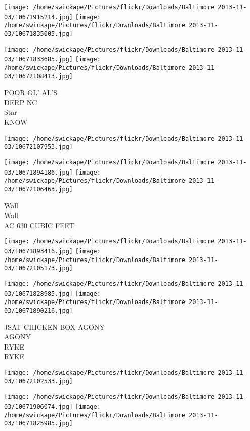 \documentclass[10pt,letterpaper]{article}
\begin{document}
\texttt{[image: /home/swickape/Pictures/flickr/Downloads/Baltimore 2013-11-03/10671915214.jpg]}
\texttt{[image: /home/swickape/Pictures/flickr/Downloads/Baltimore 2013-11-03/10671835005.jpg]}

\texttt{[image: /home/swickape/Pictures/flickr/Downloads/Baltimore 2013-11-03/10671833685.jpg]}
\texttt{[image: /home/swickape/Pictures/flickr/Downloads/Baltimore 2013-11-03/10672108413.jpg]}

POOR OL' AL'S\\
DERP NC\\
Star\\
KNOW\\
\pagebreak

\texttt{[image: /home/swickape/Pictures/flickr/Downloads/Baltimore 2013-11-03/10672107953.jpg]}

\vspace{0.25in}
\texttt{[image: /home/swickape/Pictures/flickr/Downloads/Baltimore 2013-11-03/10671894186.jpg]}
\texttt{[image: /home/swickape/Pictures/flickr/Downloads/Baltimore 2013-11-03/10672106463.jpg]}

Wall\\
Wall\\
AC 630 CUBIC FEET\\
\pagebreak

\texttt{[image: /home/swickape/Pictures/flickr/Downloads/Baltimore 2013-11-03/10671893416.jpg]}
\texttt{[image: /home/swickape/Pictures/flickr/Downloads/Baltimore 2013-11-03/10672105173.jpg]}

\texttt{[image: /home/swickape/Pictures/flickr/Downloads/Baltimore 2013-11-03/10671828985.jpg]}
\texttt{[image: /home/swickape/Pictures/flickr/Downloads/Baltimore 2013-11-03/10671890216.jpg]}

JSAT CHICKEN BOX AGONY\\
AGONY\\
RYKE\\
RYKE\\
\pagebreak

\texttt{[image: /home/swickape/Pictures/flickr/Downloads/Baltimore 2013-11-03/10672102533.jpg]}

\vspace{0.25in}
\texttt{[image: /home/swickape/Pictures/flickr/Downloads/Baltimore 2013-11-03/10671906074.jpg]}
\texttt{[image: /home/swickape/Pictures/flickr/Downloads/Baltimore 2013-11-03/10671825985.jpg]}
\end{document}
